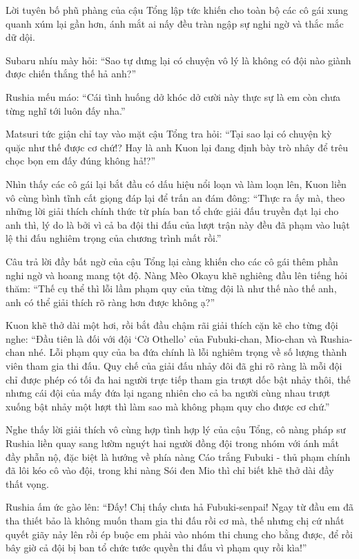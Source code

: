 \documentclass[../main.tex]{subfiles}
\begin{document}
Lời tuyên bố phũ phàng của cậu Tổng lập tức khiến cho toàn bộ các cô gái xung quanh xúm lại gần hơn, ánh mắt ai nấy đều tràn ngập sự nghi ngờ và thắc mắc dữ dội.

Subaru nhíu mày hỏi: ``Sao tự dưng lại có chuyện vô lý là không có đội nào giành được chiến thắng thế hả anh?''

Rushia mếu máo: ``Cái tình huống dở khóc dở cười này thực sự là em còn chưa từng nghĩ tới luôn đấy nha.''

Matsuri tức giận chỉ tay vào mặt cậu Tổng tra hỏi: ``Tại sao lại có chuyện kỳ quặc như thế được cơ chứ!? Hay là anh Kuon lại đang định bày trò nhây để trêu chọc bọn em đấy đúng không hả!?''

Nhìn thấy các cô gái lại bắt đầu có dấu hiệu nổi loạn và làm loạn lên, Kuon liền vô cùng bình tĩnh cất giọng đáp lại để trấn an đám đông: ``Thực ra ấy mà, theo những lời giải thích chính thức từ phía ban tổ chức giải đấu truyền đạt lại cho anh thì, lý do là bởi vì cả ba đội thi đấu của lượt trận này đều đã phạm vào luật lệ thi đấu nghiêm trọng của chương trình mất rồi.''

Câu trả lời đầy bất ngờ của cậu Tổng lại càng khiến cho các cô gái thêm phần nghi ngờ và hoang mang tột độ. Nàng Mèo Okayu khẽ nghiêng đầu lên tiếng hỏi thăm: ``Thế cụ thể thì lỗi lầm phạm quy của từng đội là như thế nào thế anh, anh có thể giải thích rõ ràng hơn được không ạ?''

Kuon khẽ thở dài một hơi, rồi bắt đầu chậm rãi giải thích cặn kẽ cho từng đội nghe: ``Đầu tiên là đối với đội `Cờ Othello' của Fubuki-chan, Mio-chan và Rushia-chan nhé. Lỗi phạm quy của ba đứa chính là lỗi nghiêm trọng về số lượng thành viên tham gia thi đấu. Quy chế của giải đấu nhảy đôi đã ghi rõ ràng là mỗi đội chỉ được phép có tối đa hai người trực tiếp tham gia trượt dốc bật nhảy thôi, thế nhưng cái đội của mấy đứa lại ngang nhiên cho cả ba người cùng nhau trượt xuống bật nhảy một lượt thì làm sao mà không phạm quy cho được cơ chứ.''

Nghe thấy lời giải thích vô cùng hợp tình hợp lý của cậu Tổng, cô nàng pháp sư Rushia liền quay sang lườm nguýt hai người đồng đội trong nhóm với ánh mắt đầy phẫn nộ, đặc biệt là hướng về phía nàng Cáo trắng Fubuki - thủ phạm chính đã lôi kéo cô vào đội, trong khi nàng Sói đen Mio thì chỉ biết khẽ thở dài đầy thất vọng.

Rushia ấm ức gào lên: ``Đấy! Chị thấy chưa hả Fubuki-senpai! Ngay từ đầu em đã tha thiết bảo là không muốn tham gia thi đấu rồi cơ mà, thế nhưng chị cứ nhất quyết giãy nảy lên rồi ép buộc em phải vào nhóm thi chung cho bằng được, để rồi bây giờ cả đội bị ban tổ chức tước quyền thi đấu vì phạm quy rồi kìa!''
\end{document}
